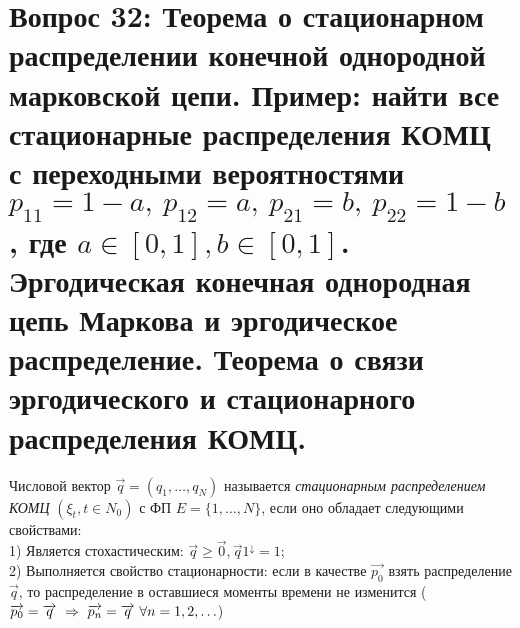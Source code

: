 \section{Вопрос 32:
Теорема о стационарном распределении конечной однородной марковской цепи.
Пример: найти все стационарные распределения КОМЦ с переходными вероятностями
$p_{11} = 1 - a, \ p_{12} = a, \ p_{21} = b, \ p_{22} = 1 - b$, где $a \in [0,1], b \in [0,1]$.
Эргодическая конечная однородная цепь Маркова и эргодическое распределение.
Теорема о связи эргодического и стационарного распределения КОМЦ.
}

\begin{defs}
  Числовой вектор $\overrightarrow{q} = (q_1, \ldots, q_N)$ называется \textit{стационарным распределением КОМЦ}
  $(\xi_t, t \in N_0)$ с ФП $E = \{1, \ldots, N\}$, если оно обладает следующими свойствами:\\
  1) Является стохастическим: $\overrightarrow{q} \geqslant \overrightarrow{0}, \overrightarrow{q}1^\downarrow = 1$;\\
  2) Выполняется свойство стационарности: если в качестве $\overrightarrow{p_0}$ взять распределение $\overrightarrow{q}$, то распределение
  в оставшиеся моменты времени не изменится ($\overrightarrow{p_0} = \overrightarrow{q} \ \Rightarrow \
  \overrightarrow{p_n} = \overrightarrow{q} \ \forall n = 1,2,\ldots$)
\end{defs}

